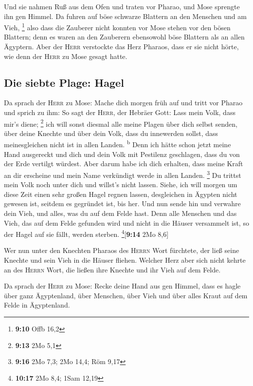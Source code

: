  Und sie nahmen Ruß aus dem Ofen und traten vor Pharao,
und Mose sprengte ihn gen Himmel. Da fuhren auf böse schwarze Blattern
an den Menschen und am Vieh, \footnote{\textbf{9:10} Offb 16,2}
 also dass die Zauberer nicht konnten vor Mose stehen vor
den bösen Blattern; denn es waren an den Zauberern ebensowohl böse
Blattern als an allen Ägyptern.  Aber der \textsc{Herr}
verstockte das Herz Pharaos, dass er sie nicht hörte, wie denn der
\textsc{Herr} zu Mose gesagt hatte.

\hypertarget{die-siebte-plage-hagel}{%
\subsection{Die siebte Plage: Hagel}\label{die-siebte-plage-hagel}}

 Da sprach der \textsc{Herr} zu Mose: Mache dich morgen
früh auf und tritt vor Pharao und sprich zu ihm: So sagt der
\textsc{Herr}, der Hebräer Gott: Lass mein Volk, dass mir's diene;
\footnote{\textbf{9:13} 2Mo 5,1}  ich will sonst diesmal
alle meine Plagen über dich selbst senden, über deine Knechte und über
dein Volk, dass du innewerden sollst, dass meinesgleichen nicht ist in
allen Landen. \textsuperscript{b}  Denn ich hätte schon
jetzt meine Hand ausgereckt und dich und dein Volk mit Pestilenz
geschlagen, dass du von der Erde vertilgt würdest.  Aber
darum habe ich dich erhalten, dass meine Kraft an dir erscheine und mein
Name verkündigt werde in allen Landen. \footnote{\textbf{9:16} 2Mo 7,3;
  2Mo 14,4; Röm 9,17}  Du trittst mein Volk noch unter
dich und willst's nicht lassen.  Siehe, ich will morgen
um diese Zeit einen sehr großen Hagel regnen lassen, desgleichen in
Ägypten nicht gewesen ist, seitdem es gegründet ist, bis her.
 Und nun sende hin und verwahre dein Vieh, und alles, was
du auf dem Felde hast. Denn alle Menschen und das Vieh, das auf dem
Felde gefunden wird und nicht in die Häuser versammelt ist, so der Hagel
auf sie fällt, werden sterben. \footnote{\textbf{10:17} 2Mo 8,4; 1Sam
  12,19}{[}\textbf{9:14} 2Mo 8,6{]}

 Wer nun unter den Knechten Pharaos des \textsc{Herrn}
Wort fürchtete, der ließ seine Knechte und sein Vieh in die Häuser
fliehen.  Welcher Herz aber sich nicht kehrte an des
\textsc{Herrn} Wort, die ließen ihre Knechte und ihr Vieh auf dem Felde.

 Da sprach der \textsc{Herr} zu Mose: Recke deine Hand
aus gen Himmel, dass es hagle über ganz Ägyptenland, über Menschen, über
Vieh und über alles Kraut auf dem Felde in Ägyptenland.


